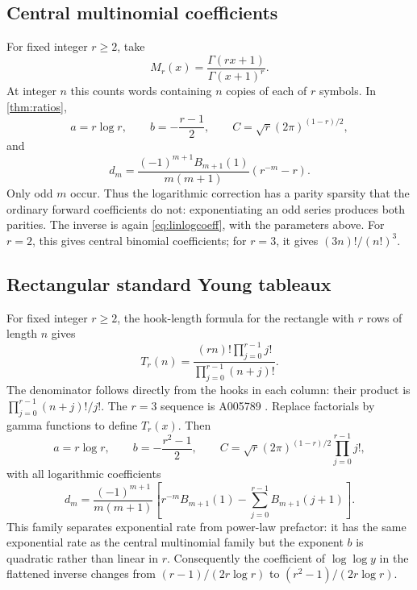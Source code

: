 \documentclass[11pt,a4paper]{article}
\theoremstyle{definition}
\theoremstyle{remark}
\numberwithin{equation}{section}
\begin{document}
\subsection{Central multinomial coefficients}
For fixed integer $r\ge2$, take
\begin{equation}
 M_r(x)=\frac{\Gamma(rx+1)}{\Gamma(x+1)^r}.
 \label{eq:multinomial}
\end{equation}
At integer $n$ this counts words containing $n$ copies of each of $r$ symbols. In \cref{thm:ratios},
\begin{equation}
 a=r\log r,\qquad b=-\frac{r-1}{2},\qquad
 C=\sqrt r(2\pi)^{(1-r)/2},
 \label{eq:multinomialparameters}
\end{equation}
and
\begin{equation}
 d_m=\frac{(-1)^{m+1}B_{m+1}(1)}{m(m+1)}(r^{-m}-r).
 \label{eq:multinomiald}
\end{equation}
Only odd $m$ occur. Thus the logarithmic correction has a parity sparsity that the ordinary forward coefficients do not: exponentiating an odd series produces both parities. The inverse is again \eqref{eq:linlogcoeff}, with the parameters above. For $r=2$, this gives central binomial coefficients; for $r=3$, it gives $(3n)!/(n!)^3$.

\subsection{Rectangular standard Young tableaux}
For fixed integer $r\ge2$, the hook-length formula for the rectangle with $r$ rows of length $n$ gives
\begin{equation}
 T_r(n)=\frac{(rn)!\prod_{j=0}^{r-1}j!}{\prod_{j=0}^{r-1}(n+j)!}.
 \label{eq:tableaux}
\end{equation}
The denominator follows directly from the hooks in each column: their product is
$\prod_{j=0}^{r-1}(n+j)!/j!$. The $r=3$ sequence is A005789 \cite{oeistableaux}. Replace factorials by gamma functions to define $T_r(x)$. Then
\begin{equation}
 a=r\log r,\qquad b=-\frac{r^2-1}{2},\qquad
 C=\sqrt r(2\pi)^{(1-r)/2}\prod_{j=0}^{r-1}j!,
 \label{eq:tableauxparameters}
\end{equation}
with all logarithmic coefficients
\begin{equation}
 d_m=\frac{(-1)^{m+1}}{m(m+1)}
 \left[r^{-m}B_{m+1}(1)-\sum_{j=0}^{r-1}B_{m+1}(j+1)\right].
 \label{eq:tableauxd}
\end{equation}
This family separates exponential rate from power-law prefactor: it has the same exponential rate as the central multinomial family but the exponent $b$ is quadratic rather than linear in $r$. Consequently the coefficient of $\log\log y$ in the flattened inverse changes from $(r-1)/(2r\log r)$ to $(r^2-1)/(2r\log r)$.
\end{document}
